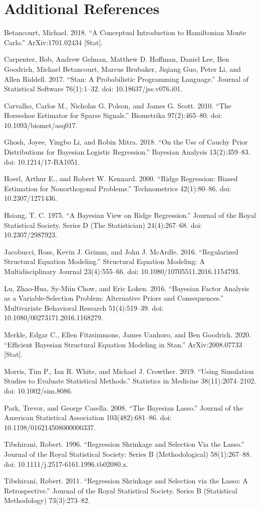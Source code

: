 \documentclass[
  english,
  man]{apa6}
\begin{document}
\begingroup
\setlength{\parskip}{0in}
\setlength{\parindent}{-0.27in}
\setlength{\leftskip}{0.5in}

\hypertarget{additional-references}{%
\section{Additional References}\label{additional-references}}

Betancourt, Michael. 2018. ``A Conceptual Introduction to Hamiltonian Monte Carlo.'' ArXiv:1701.02434 {[}Stat{]}.

Carpenter, Bob, Andrew Gelman, Matthew D. Hoffman, Daniel Lee, Ben Goodrich, Michael Betancourt, Marcus Brubaker, Jiqiang Guo, Peter Li, and Allen Riddell. 2017. ``Stan: A Probabilistic Programming Language.'' Journal of Statistical Software 76(1):1--32. doi: 10.18637/jss.v076.i01.

Carvalho, Carlos M., Nicholas G. Polson, and James G. Scott. 2010. ``The Horseshoe Estimator for Sparse Signals.'' Biometrika 97(2):465--80. doi: 10.1093/biomet/asq017.

Ghosh, Joyee, Yingbo Li, and Robin Mitra. 2018. ``On the Use of Cauchy Prior Distributions for Bayesian Logistic Regression.'' Bayesian Analysis 13(2):359--83. doi: 10.1214/17-BA1051.

Hoerl, Arthur E., and Robert W. Kennard. 2000. ``Ridge Regression: Biased Estimation for Nonorthogonal Problems.'' Technometrics 42(1):80--86. doi: 10.2307/1271436.

Hsiang, T. C. 1975. ``A Bayesian View on Ridge Regression.'' Journal of the Royal Statistical Society. Series D (The Statistician) 24(4):267--68. doi: 10.2307/2987923.

Jacobucci, Ross, Kevin J. Grimm, and John J. McArdle. 2016. ``Regularized Structural Equation Modeling.'' Structural Equation Modeling: A Multidisciplinary Journal 23(4):555--66. doi: 10.1080/10705511.2016.1154793.

Lu, Zhao-Hua, Sy-Miin Chow, and Eric Loken. 2016. ``Bayesian Factor Analysis as a Variable-Selection Problem: Alternative Priors and Consequences.'' Multivariate Behavioral Research 51(4):519--39. doi: 10.1080/00273171.2016.1168279.

Merkle, Edgar C., Ellen Fitzsimmons, James Uanhoro, and Ben Goodrich. 2020. ``Efficient Bayesian Structural Equation Modeling in Stan.'' ArXiv:2008.07733 {[}Stat{]}.

Morris, Tim P., Ian R. White, and Michael J. Crowther. 2019. ``Using Simulation Studies to Evaluate Statistical Methods.'' Statistics in Medicine 38(11):2074--2102. doi: 10.1002/sim.8086.

Park, Trevor, and George Casella. 2008. ``The Bayesian Lasso.'' Journal of the American Statistical Association 103(482):681--86. doi: 10.1198/016214508000000337.

Tibshirani, Robert. 1996. ``Regression Shrinkage and Selection Via the Lasso.'' Journal of the Royal Statistical Society: Series B (Methodological) 58(1):267--88. doi: 10.1111/j.2517-6161.1996.tb02080.x.

Tibshirani, Robert. 2011. ``Regression Shrinkage and Selection via the Lasso: A Retrospective.'' Journal of the Royal Statistical Society. Series B (Statistical Methodology) 73(3):273--82.
\end{document}
